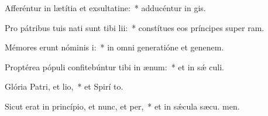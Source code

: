 \item Afferéntur in lætítia et exsultatine:~* adducéntur in  gis.
\item Pro pátribus tuis nati sunt tibi lii:~* constítues eos príncipes super  ram.
\item Mémores erunt nóminis i:~* in omni generatióne et genenem.
\item Proptérea pópuli confitebúntur tibi in ænum:~* et in sǽ culi.
\item Glória Patri, et lio,~* et Spirí to.
\item Sicut erat in princípio, et nunc, et per,~* et in sǽcula sæcu. men.
